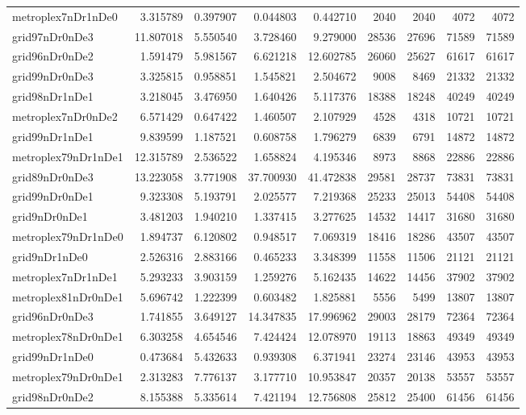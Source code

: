 \begin{longtable}{|l|r|r|r|r|r|r|r|r|}
metroplex7nDr1nDe0 & 3.315789 & 0.397907 & 0.044803 & 0.442710 & 2040 & 2040 & 4072 & 4072 \\
grid97nDr0nDe3 & 11.807018 & 5.550540 & 3.728460 & 9.279000 & 28536 & 27696 & 71589 & 71589 \\
grid96nDr0nDe2 & 1.591479 & 5.981567 & 6.621218 & 12.602785 & 26060 & 25627 & 61617 & 61617 \\
grid99nDr0nDe3 & 3.325815 & 0.958851 & 1.545821 & 2.504672 & 9008 & 8469 & 21332 & 21332 \\
grid98nDr1nDe1 & 3.218045 & 3.476950 & 1.640426 & 5.117376 & 18388 & 18248 & 40249 & 40249 \\
metroplex7nDr0nDe2 & 6.571429 & 0.647422 & 1.460507 & 2.107929 & 4528 & 4318 & 10721 & 10721 \\
grid99nDr1nDe1 & 9.839599 & 1.187521 & 0.608758 & 1.796279 & 6839 & 6791 & 14872 & 14872 \\
metroplex79nDr1nDe1 & 12.315789 & 2.536522 & 1.658824 & 4.195346 & 8973 & 8868 & 22886 & 22886 \\
grid89nDr0nDe3 & 13.223058 & 3.771908 & 37.700930 & 41.472838 & 29581 & 28737 & 73831 & 73831 \\
grid99nDr0nDe1 & 9.323308 & 5.193791 & 2.025577 & 7.219368 & 25233 & 25013 & 54408 & 54408 \\
grid9nDr0nDe1 & 3.481203 & 1.940210 & 1.337415 & 3.277625 & 14532 & 14417 & 31680 & 31680 \\
metroplex79nDr1nDe0 & 1.894737 & 6.120802 & 0.948517 & 7.069319 & 18416 & 18286 & 43507 & 43507 \\
grid9nDr1nDe0 & 2.526316 & 2.883166 & 0.465233 & 3.348399 & 11558 & 11506 & 21121 & 21121 \\
metroplex7nDr1nDe1 & 5.293233 & 3.903159 & 1.259276 & 5.162435 & 14622 & 14456 & 37902 & 37902 \\
metroplex81nDr0nDe1 & 5.696742 & 1.222399 & 0.603482 & 1.825881 & 5556 & 5499 & 13807 & 13807 \\
grid96nDr0nDe3 & 1.741855 & 3.649127 & 14.347835 & 17.996962 & 29003 & 28179 & 72364 & 72364 \\
metroplex78nDr0nDe1 & 6.303258 & 4.654546 & 7.424424 & 12.078970 & 19113 & 18863 & 49349 & 49349 \\
grid99nDr1nDe0 & 0.473684 & 5.432633 & 0.939308 & 6.371941 & 23274 & 23146 & 43953 & 43953 \\
metroplex79nDr0nDe1 & 2.313283 & 7.776137 & 3.177710 & 10.953847 & 20357 & 20138 & 53557 & 53557 \\
grid98nDr0nDe2 & 8.155388 & 5.335614 & 7.421194 & 12.756808 & 25812 & 25400 & 61456 & 61456 \\

\end{longtable}
